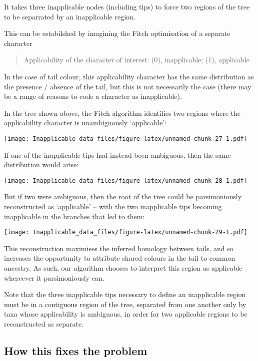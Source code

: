 \documentclass[]{book}
\theoremstyle{definition}
\theoremstyle{definition}
\theoremstyle{definition}
\theoremstyle{remark}
\begin{document}
It takes three inapplicable nodes (including tips) to force two regions
of the tree to be separrated by an inapplicable region.

This can be estabilshed by imagining the Fitch optimisation of a
separate character

\begin{quote}
Applicability of the character of interest: (0), inapplicable; (1),
applicable
\end{quote}

In the case of tail colour, this applicability character has the same
distribution as the presence / absence of the tail, but this is not
necessarily the case (there may be a range of reasons to code a
character as inapplicable).

In the tree shown above, the Fitch algorithm identifies two regions
where the applicability character is unambiguously `applicable':

\texttt{[image: Inapplicable\_data\_files/figure-latex/unnamed-chunk-27-1.pdf]}

If one of the inapplicable tips had instead been ambiguous, then the
same distribution would arise:

\texttt{[image: Inapplicable\_data\_files/figure-latex/unnamed-chunk-28-1.pdf]}

But if two were ambiguous, then the root of the tree could be
parsimoniously reconstructed as `applicable' -- with the two
inapplicable tips becoming inapplicable in the branches that led to
them:

\texttt{[image: Inapplicable\_data\_files/figure-latex/unnamed-chunk-29-1.pdf]}

This reconstruction maximises the inferred homology between tails, and
so increases the opportunity to attribute shared colours in the tail to
common ancestry. As such, our algorithm chooses to interpret this region
as applicable whereever it parsimoniously can.

Note that the three inapplicable tips necessary to define an
inapplicable region must be in a contiguous region of the tree,
separated from one another only by taxa whose applicability is
ambiguous, in order for two applicable regions to be reconstructed as
separate.

\hypertarget{how-this-fixes-the-problem}{%
\subsection{How this fixes the
problem}\label{how-this-fixes-the-problem}}
\end{document}
